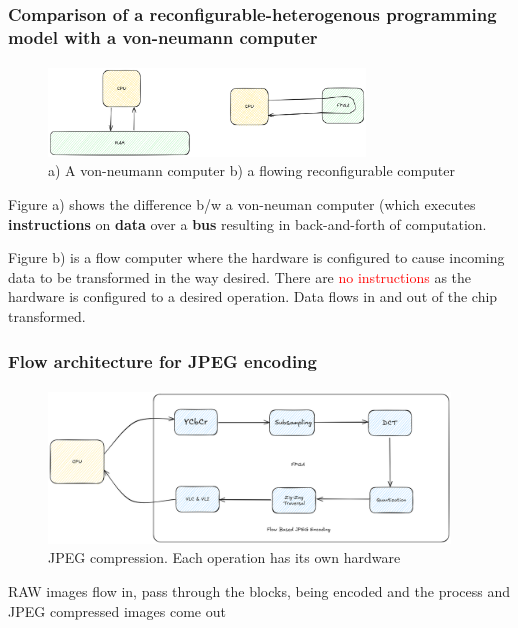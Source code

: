 \documentclass{beamer}
\begin{document}
\begin{frame}[fragile]
  \frametitle{Comparison of a reconfigurable-heterogenous programming model with a von-neumann
  computer}
  \framesubtitle{}
  \begin{figure}
    \centering
    \includegraphics[width=0.75\textwidth]{flow.png}
    \caption{a) A von-neumann computer b) a flowing reconfigurable computer}
    \label{}
  \end{figure}
  Figure a) shows the difference b/w a von-neuman computer (which executes
  \textbf{instructions} on \textbf{data} over a \textbf{bus} resulting in
  back-and-forth of computation. 

  Figure b) is a flow computer where the
  hardware is configured to cause incoming data to be transformed in the
  way desired. There are \textcolor{red}{no instructions} as the hardware
  is configured to a desired operation. Data flows in and out
  of the chip transformed. 
\end{frame}



\begin{frame}[fragile]
  \frametitle{Flow architecture for JPEG encoding}
  \framesubtitle{}
  \begin{figure}
    \centering
    \includegraphics[width=0.95\textwidth]{flowjpeg.png}
    \caption{JPEG compression. Each operation has its own hardware}
    \label{}
  \end{figure}

  RAW images flow in, pass through the blocks, being encoded
  and the process and JPEG compressed images come out
\end{frame}
\end{document}
